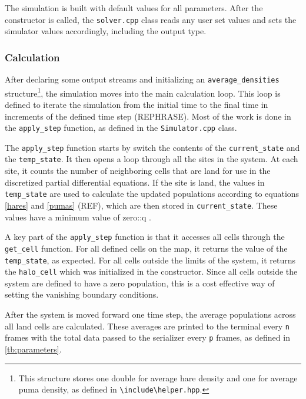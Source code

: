 \documentclass[a4paper,11pt]{article}
\begin{document}
The simulation is built with default values for all parameters.  After the constructor is called, the \texttt{solver.cpp} class reads any user set values and sets the simulator values accordingly, including the output type.

\subsubsection{Calculation}

After declaring some output streams and initializing an \texttt{average\_densities} structure\footnote{This structure stores one double for average hare density and one for average puma density, as defined in \texttt{\textbackslash include\textbackslash helper.hpp}.}, the simulation moves into the main calculation loop.  This loop is defined to iterate the simulation from the initial time to the final time in increments of the defined time step (REPHRASE).  Most of the work is done in the \texttt{apply\_step} function, as defined in the \texttt{Simulator.cpp} class.  

The  \texttt{apply\_step} function starts by switch the contents of the  \texttt{current\_state} and the \texttt{temp\_state}.  It then opens a loop through all the sites in the system.  At each site, it counts the number of neighboring cells that are land for use in the discretized partial differential equations.  If the site is land, the values in \texttt{temp\_state} are used to calculate the updated populations according to equations \eqref{hares} and \eqref{pumas} (REF), which are then stored in \texttt{current\_state}.  These values have a minimum value of zero::q
.  

A key part of the \texttt{apply\_step} function is that it accesses all cells through the \texttt{get\_cell} function.  For all defined cells on the map, it returns the value of the \texttt{temp\_state}, as expected.  For all cells outside the limits of the system, it returns the \texttt{halo\_cell} which was initialized in the constructor.  Since all cells outside the system are defined to have a zero population, this is a cost effective way of setting the vanishing boundary conditions.


After the system is moved forward one time step, the average populations across all land cells are calculated.  These averages are printed to the terminal every \texttt{n} frames with the total data passed to the serializer every \texttt{p} frames, as defined in \ref{tb:parameters}.
\end{document}
